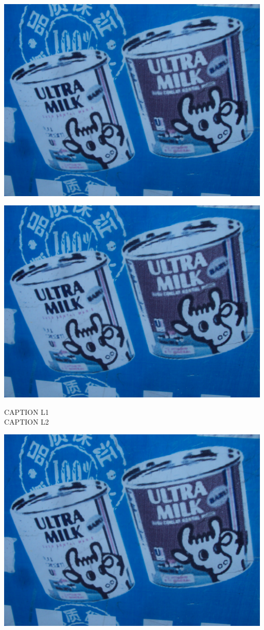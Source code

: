 \documentclass[10pt,letterpaper]{article}
\begin{document}
\includegraphics[width=5.19in]{landscape.jpg}

\vspace{0.25in}
\includegraphics[width=5.19in]{landscape.jpg}

CAPTION L1\\
CAPTION L2\\
\pagebreak

\includegraphics[width=5.19in]{landscape.jpg}
\end{document}
